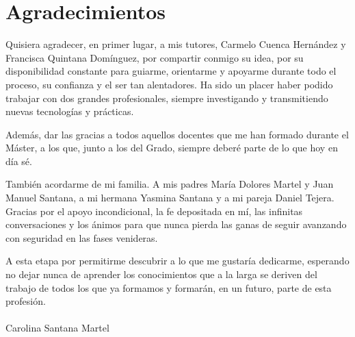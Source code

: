 \chapter*{Agradecimientos}

Quisiera agradecer, en primer lugar, a mis tutores, Carmelo Cuenca Hernández y Francisca Quintana Domínguez, por compartir conmigo su idea, por su disponibilidad constante para guiarme, orientarme y apoyarme durante todo el proceso, su confianza y el ser tan alentadores. Ha sido un placer haber podido trabajar con dos grandes profesionales, siempre investigando y transmitiendo nuevas tecnologías y prácticas.  

Además, dar las gracias a todos aquellos docentes que me han formado durante el Máster, a los que, junto a los del Grado, siempre deberé parte de lo que hoy en día sé.

También acordarme de mi familia. A mis padres María Dolores Martel y Juan Manuel Santana, a mi hermana Yasmina Santana y a mi pareja Daniel Tejera. Gracias por el apoyo incondicional, la fe depositada en mí, las infinitas conversaciones y los ánimos para que nunca pierda las ganas de seguir avanzando con seguridad en las fases venideras.

A esta etapa por permitirme descubrir a lo que me gustaría dedicarme, esperando no dejar nunca de aprender los conocimientos que a la larga se deriven del trabajo de todos los que ya formamos y formarán, en un futuro, parte de esta profesión.
\\
\\
Carolina Santana Martel
